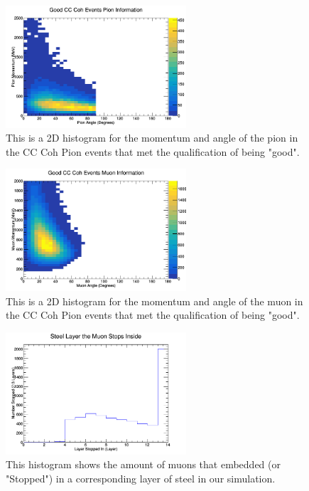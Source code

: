 \documentclass[11pt]{article}
\begin{document}
\begin{figure}[H]
\centering
\includegraphics[width=0.6\textwidth]{NewNMReinSehgalImages/5-GoodCCCohPionInfoNMRS.png}
\caption{This is a 2D histogram for the momentum and angle of the pion in the CC Coh Pion events that met the qualification of being "good".}
\end{figure}

\begin{figure}[H]
\centering
\includegraphics[width=0.6\textwidth]{NewNMReinSehgalImages/6-GoodCCCohMuonInfoNMRS.png}
\caption{This is a 2D histogram for the momentum and angle of the muon in the CC Coh Pion events that met the qualification of being "good".}
\end{figure}

\begin{figure}[H]
\centering
\includegraphics[width=0.6\textwidth]{NewNMReinSehgalImages/7-LayerPenetrationNMRS.png}
\caption{This histogram shows the amount of muons that embedded (or "Stopped") in a corresponding layer of steel in our simulation.}
\end{figure}
\end{document}

